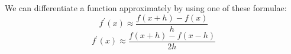  We can differentiate a function approximately by using one of these formulae:
\[ f^{\prime} (x) \approx \frac{f(x+h)-f(x)}{h} \]
\[ f^{\prime} (x) \approx \frac{f(x+h)-f(x-h)}{2h} \]
